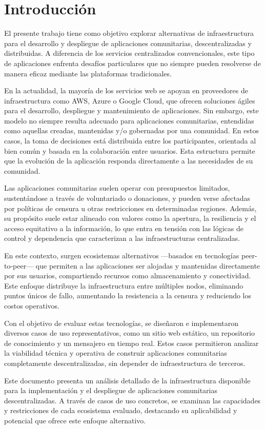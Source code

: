 \section{Introducción}

El presente trabajo tiene como objetivo explorar alternativas de infraestructura para el desarrollo y despliegue de aplicaciones comunitarias, descentralizadas y distribuidas. A diferencia de los servicios centralizados convencionales, este tipo de aplicaciones enfrenta desafíos particulares que no siempre pueden resolverse de manera eficaz mediante las plataformas tradicionales.

En la actualidad, la mayoría de los servicios web se apoyan en proveedores de infraestructura como AWS, Azure o Google Cloud, que ofrecen soluciones ágiles para el desarrollo, despliegue y mantenimiento de aplicaciones. Sin embargo, este modelo no siempre resulta adecuado para aplicaciones comunitarias, entendidas como aquellas creadas, mantenidas y/o gobernadas por una comunidad. En estos casos, la toma de decisiones está distribuida entre los participantes, orientada al bien común y basada en la colaboración entre usuarios. Esta estructura permite que la evolución de la aplicación responda directamente a las necesidades de su comunidad.

Las aplicaciones comunitarias suelen operar con presupuestos limitados, sustentándose a través de voluntariado o donaciones, y pueden verse afectadas por políticas de censura u otras restricciones en determinadas regiones. Además, su propósito suele estar alineado con valores como la apertura, la resiliencia y el acceso equitativo a la información, lo que entra en tensión con las lógicas de control y dependencia que caracterizan a las infraestructuras centralizadas.

En este contexto, surgen ecosistemas alternativos —basados en tecnologías peer-to-peer— que permiten a las aplicaciones ser alojadas y mantenidas directamente por sus usuarios, compartiendo recursos como almacenamiento y conectividad. Este enfoque distribuye la infraestructura entre múltiples nodos, eliminando puntos únicos de fallo, aumentando la resistencia a la censura y reduciendo los costos operativos.

Con el objetivo de evaluar estas tecnologías, se diseñaron e implementaron diversos casos de uso representativos, como un sitio web estático, un repositorio de conocimiento y un mensajero en tiempo real. Estos casos permitieron analizar la viabilidad técnica y operativa de construir aplicaciones comunitarias completamente descentralizadas, sin depender de infraestructura de terceros.

Este documento presenta un análisis detallado de la infraestructura disponible para la implementación y el despliegue de aplicaciones comunitarias descentralizadas. A través de casos de uso concretos, se examinan las capacidades y restricciones de cada ecosistema evaluado, destacando su aplicabilidad y potencial que ofrece este enfoque alternativo.